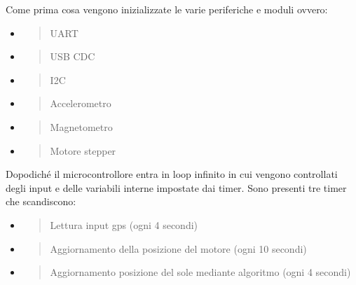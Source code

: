 \noindent Come prima cosa vengono inizializzate le varie periferiche e moduli
ovvero:

\begin{itemize}
\item
  \begin{quote}
  UART
  \end{quote}
\item
  \begin{quote}
  USB CDC
  \end{quote}
\item
  \begin{quote}
  I2C
  \end{quote}
\item
  \begin{quote}
  Accelerometro
  \end{quote}
\item
  \begin{quote}
  Magnetometro
  \end{quote}
\item
  \begin{quote}
  Motore stepper
  \end{quote}
\end{itemize}

\noindent Dopodiché il microcontrollore entra in loop infinito in cui vengono
controllati degli input e delle variabili interne impostate dai timer.
Sono presenti tre timer che scandiscono:

\begin{itemize}
\item
  \begin{quote}
  Lettura input gps (ogni 4 secondi)
  \end{quote}
\item
  \begin{quote}
  Aggiornamento della posizione del motore (ogni 10 secondi)
  \end{quote}
\item
  \begin{quote}
  Aggiornamento posizione del sole mediante algoritmo (ogni 4 secondi)
  \end{quote}
\end{itemize}

